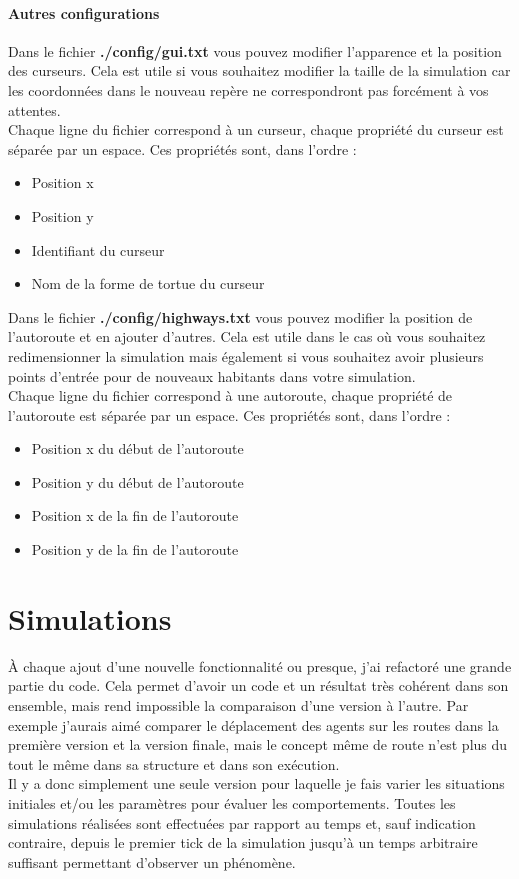 \documentclass[11pt]{report}
\begin{document}
\newpage
\subsubsection{Autres configurations}
Dans le fichier \textbf{./config/gui.txt} vous pouvez modifier l'apparence et la position des curseurs.
Cela est utile si vous souhaitez modifier la taille de la simulation car les coordonnées dans le nouveau repère ne correspondront pas forcément à vos attentes.\\
Chaque ligne du fichier correspond à un curseur, chaque propriété du curseur est séparée par un espace. Ces propriétés sont, dans l'ordre :
\begin{itemize}
	\item Position x
	\item Position y
	\item Identifiant du curseur
	\item Nom de la forme de tortue du curseur
\end{itemize}
Dans le fichier \textbf{./config/highways.txt} vous pouvez modifier la position de l'autoroute et en ajouter d'autres.
Cela est utile dans le cas où vous souhaitez redimensionner la simulation mais également si vous souhaitez avoir plusieurs points d'entrée pour de nouveaux habitants dans votre simulation.\\
Chaque ligne du fichier correspond à une autoroute, chaque propriété de l'autoroute est séparée par un espace. Ces propriétés sont, dans l'ordre :
\begin{itemize}
	\item Position x du début de l'autoroute
	\item Position y du début de l'autoroute
	\item Position x de la fin de l'autoroute
	\item Position y de la fin de l'autoroute
\end{itemize}




\chapter{Simulations}
À chaque ajout d'une nouvelle fonctionnalité ou presque, j'ai refactoré une grande partie du code. Cela permet d'avoir un code et un résultat très cohérent dans son ensemble, mais rend impossible la comparaison d'une version à l'autre. Par exemple j'aurais aimé comparer le déplacement des agents sur les routes dans la première version et la version finale, mais le concept même de route n'est plus du tout le même dans sa structure et dans son exécution.\\
Il y a donc simplement une seule version pour laquelle je fais varier les situations initiales et/ou les paramètres pour évaluer les comportements. Toutes les simulations réalisées sont effectuées par rapport au temps et, sauf indication contraire, depuis le premier tick de la simulation jusqu'à un temps arbitraire suffisant permettant d'observer un phénomène.
\end{document}
